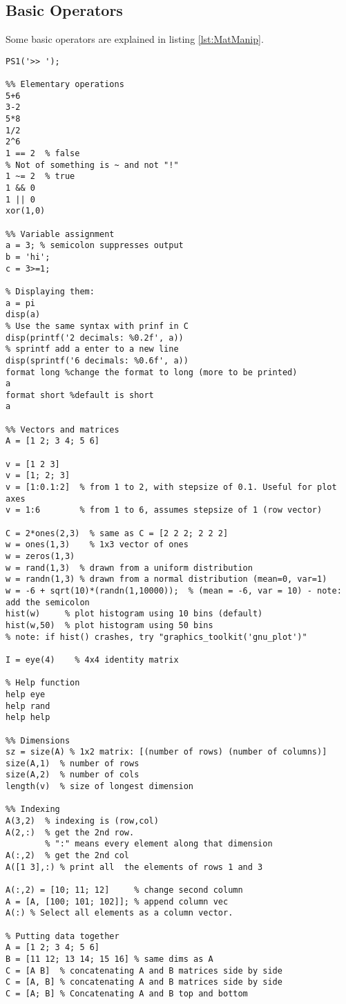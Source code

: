 \subsection{Basic Operators}
Some basic operators are explained in listing \ref{lst:MatManip}. 
\begin{lstlisting}[label=lst:MatManip,caption=Basic Octave]
%% Change Octave prompt  
PS1('>> ');

%% Elementary operations
5+6
3-2
5*8
1/2
2^6
1 == 2  % false
% Not of something is ~ and not "!" 
1 ~= 2  % true
1 && 0
1 || 0
xor(1,0)

%% Variable assignment
a = 3; % semicolon suppresses output
b = 'hi';
c = 3>=1;

% Displaying them:
a = pi
disp(a)
% Use the same syntax with prinf in C
disp(printf('2 decimals: %0.2f', a))
% sprintf add a enter to a new line 
disp(sprintf('6 decimals: %0.6f', a))
format long %change the format to long (more to be printed)
a
format short %default is short
a

%% Vectors and matrices
A = [1 2; 3 4; 5 6]

v = [1 2 3]
v = [1; 2; 3]
v = [1:0.1:2]  % from 1 to 2, with stepsize of 0.1. Useful for plot axes
v = 1:6        % from 1 to 6, assumes stepsize of 1 (row vector)

C = 2*ones(2,3)  % same as C = [2 2 2; 2 2 2]
w = ones(1,3)    % 1x3 vector of ones
w = zeros(1,3)
w = rand(1,3)  % drawn from a uniform distribution 
w = randn(1,3) % drawn from a normal distribution (mean=0, var=1)
w = -6 + sqrt(10)*(randn(1,10000));  % (mean = -6, var = 10) - note: add the semicolon
hist(w)     % plot histogram using 10 bins (default)
hist(w,50)  % plot histogram using 50 bins
% note: if hist() crashes, try "graphics_toolkit('gnu_plot')" 

I = eye(4)    % 4x4 identity matrix

% Help function
help eye
help rand
help help

%% Dimensions
sz = size(A) % 1x2 matrix: [(number of rows) (number of columns)]
size(A,1)  % number of rows
size(A,2)  % number of cols
length(v)  % size of longest dimension

%% Indexing
A(3,2)  % indexing is (row,col)
A(2,:)  % get the 2nd row. 
        % ":" means every element along that dimension
A(:,2)  % get the 2nd col
A([1 3],:) % print all  the elements of rows 1 and 3

A(:,2) = [10; 11; 12]     % change second column
A = [A, [100; 101; 102]]; % append column vec
A(:) % Select all elements as a column vector.

% Putting data together 
A = [1 2; 3 4; 5 6]
B = [11 12; 13 14; 15 16] % same dims as A
C = [A B]  % concatenating A and B matrices side by side
C = [A, B] % concatenating A and B matrices side by side
C = [A; B] % Concatenating A and B top and bottom
\end{lstlisting} 

